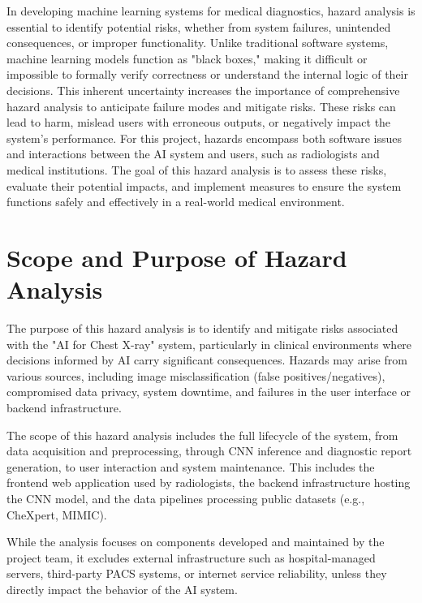 \documentclass{article}
\begin{document}
In developing machine learning systems for medical diagnostics, hazard analysis is essential to identify potential risks, whether from system failures, unintended consequences, or improper functionality. Unlike traditional software systems, machine learning models function as "black boxes," making it difficult or impossible to formally verify correctness or understand the internal logic of their decisions. This inherent uncertainty increases the importance of comprehensive hazard analysis to anticipate failure modes and mitigate risks. These risks can lead to harm, mislead users with erroneous outputs, or negatively impact the system's performance. For this project, hazards encompass both software issues and interactions between the AI system and users, such as radiologists and medical institutions. The goal of this hazard analysis is to assess these risks, evaluate their potential impacts, and implement measures to ensure the system functions safely and effectively in a real-world medical environment.


\section{Scope and Purpose of Hazard Analysis}


The purpose of this hazard analysis is to identify and mitigate risks associated with the "AI for Chest X-ray" system, particularly in clinical environments where decisions informed by AI carry significant consequences. Hazards may arise from various sources, including image misclassification (false positives/negatives), compromised data privacy, system downtime, and failures in the user interface or backend infrastructure.

The scope of this hazard analysis includes the full lifecycle of the system, from data acquisition and preprocessing, through CNN inference and diagnostic report generation, to user interaction and system maintenance. This includes the frontend web application used by radiologists, the backend infrastructure hosting the CNN model, and the data pipelines processing public datasets (e.g., CheXpert, MIMIC).

While the analysis focuses on components developed and maintained by the project team, it excludes external infrastructure such as hospital-managed servers, third-party PACS systems, or internet service reliability, unless they directly impact the behavior of the AI system.
\end{document}
